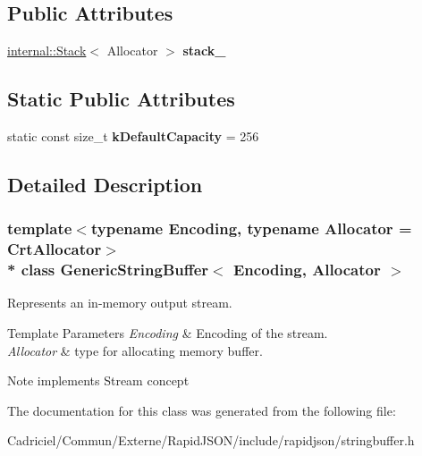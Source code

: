 \subsection*{Public Attributes}
\begin{DoxyCompactItemize}
\item 
\hyperlink{classinternal_1_1_stack}{internal\+::\+Stack}$<$ Allocator $>$ {\bfseries stack\+\_\+}\hypertarget{class_generic_string_buffer_aaef716643febb9de5957dbf8ff904409}{}\label{class_generic_string_buffer_aaef716643febb9de5957dbf8ff904409}

\end{DoxyCompactItemize}
\subsection*{Static Public Attributes}
\begin{DoxyCompactItemize}
\item 
static const size\+\_\+t {\bfseries k\+Default\+Capacity} = 256\hypertarget{class_generic_string_buffer_ae74f9df854dd5a7db4315ef44b016d22}{}\label{class_generic_string_buffer_ae74f9df854dd5a7db4315ef44b016d22}

\end{DoxyCompactItemize}


\subsection{Detailed Description}
\subsubsection*{template$<$typename Encoding, typename Allocator = Crt\+Allocator$>$\\*
class Generic\+String\+Buffer$<$ Encoding, Allocator $>$}

Represents an in-\/memory output stream. 


\begin{DoxyTemplParams}{Template Parameters}
{\em Encoding} & Encoding of the stream. \\
\hline
{\em Allocator} & type for allocating memory buffer. \\
\hline
\end{DoxyTemplParams}
\begin{DoxyNote}{Note}
implements Stream concept 
\end{DoxyNote}


The documentation for this class was generated from the following file\+:\begin{DoxyCompactItemize}
\item 
Cadriciel/\+Commun/\+Externe/\+Rapid\+J\+S\+O\+N/include/rapidjson/stringbuffer.\+h\end{DoxyCompactItemize}
